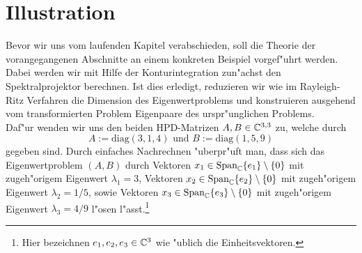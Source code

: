 \section{Illustration}\label{sec:bsp}

Bevor wir uns vom laufenden Kapitel verabschieden, soll die Theorie der vorangegangenen Abschnitte an einem konkreten Beispiel vorgef"uhrt werden. Dabei werden wir mit Hilfe der Konturintegration zun"achst den Spektralprojektor berechnen. Ist dies erledigt, reduzieren wir wie im Rayleigh-Ritz Verfahren die Dimension des Eigenwertproblems und konstruieren ausgehend vom transformierten Problem Eigenpaare des urspr"unglichen Problems.\\

Daf"ur wenden wir uns den beiden HPD-Matrizen
$A,B \in \mathbb{C}^{3,3}$ zu, welche durch
\[
A:= \text{diag}(3,1,4)\text{ und }
B:= \text{diag}(1,5,9)
\]
gegeben sind.
Durch einfaches Nachrechnen "uberpr"uft man, dass sich das Eigenwertproblem $(A,B)$ durch Vektoren
$x_1 \in \text{Span}_{\mathbb{C}}\{e_1\}\setminus\{0\}$ mit zugeh"origem Eigenwert $\lambda_1 = 3$, Vektoren
$x_2 \in \text{Span}_{\mathbb{C}}\{e_2\}\setminus\{0\}$ mit zugeh"origem Eigenwert $\lambda_2 = 1/5$, sowie
Vektoren $x_3 \in\text{Span}_{\mathbb{C}}\{e_3\}\setminus\{0\}$ mit zugeh"origem Eigenwert $\lambda_3 = 4/9$
l"osen l"asst.\footnote{Hier bezeichnen $e_1, e_2, e_3 \in\mathbb{C}^3$ wie "ublich die Einheitsvektoren.}\\

